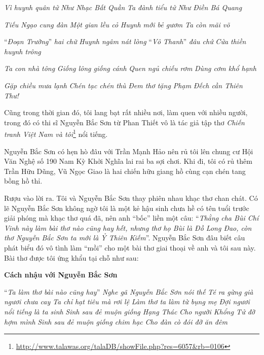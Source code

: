 \documentclass[../main.tex]{subfiles}
\begin{document}
\begin{multicols}{2}
\begin{blockquote}
\textit{Vì huynh quân tử}        
\textit{Như Nhạc Bất Quần}        
\textit{Ta đành tiểu tử} 
\textit{Như Ðiền Bá Quang} 
        
\textit{Tiếu Ngạo cung đàn}        
\textit{Một gian lều cỏ}        
\textit{Huynh mới bẻ gươm} 
\textit{Ta còn mãi võ} 
        
“\textit{Ðoạn Trường}” \textit{hai chữ}        
\textit{Huynh ngâm nát lòng}        
“\textit{Vô Thanh}” \textit{đâu chứ} 
\textit{Cửa thiền huynh trông} 
        
\textit{Ta con nhà tông}        
\textit{Giống lông giống cánh}        
\textit{Quen ngủ chiếu rơm} 
\textit{Dùng cơm khổ hạnh} 
        
\textit{Gặp chiều mưa lạnh}        
\textit{Chén tạc chén thù}        
\textit{Ðem thơ tặng Phạm} 
\textit{Ðếch cần Thiên Thư!} 

\end{blockquote}
 
Cũng trong thời gian đó, tôi lang bạt rất nhiều nơi, làm quen với nhiều người, trong đó có thi sĩ Nguyễn Bắc Sơn từ Phan Thiết vô là tác giả tập thơ \textit{Chiến tranh Việt Nam và tôi}\footnote{\url{http://www.talawas.org/talaDB/showFile.php?res=6057&rb=0106}} nổi tiếng.  
 
Nguyễn Bắc Sơn có hẹn hò đâu với Trần Mạnh Hảo nên rủ tôi lên chung cư Hội Văn Nghệ số 190 Nam Kỳ Khởi Nghĩa lai rai ba sợi chơi. Khi đi, tôi có rủ thêm Trần Hữu Dũng, Vũ Ngọc Giao là hai chiến hữu giang hồ cùng cạn chén tang bồng hồ thỉ. 
 
Rượu vào lời ra. Tôi và Nguyễn Bắc Sơn thay phiên nhau khạc thơ chan chát. Có lẽ Nguyễn Bắc Sơn không ngờ tôi là một kẻ hậu sinh chưa hề có tên tuổi trước giải phóng mà khạc thơ quá đã, nên anh “bốc” liền một câu: “\textit{Thằng cha Bùi Chí Vinh này làm bài thơ nào cũng hay hết, nhưng thơ họ Bùi là Ðồ Long Ðao, còn thơ Nguyễn Bắc Sơn ta mới là Ỷ Thiên Kiếm}”. Nguyễn Bắc Sơn đâu biết câu phát biểu đó vô tình làm “mồi” cho một bài thơ giai thoại về anh và tôi sau này. Bài thơ được tôi ứng khẩu tại chỗ như sau: 
\begin{blockquote}
 
\textbf{Cách nhậu với Nguyễn Bắc Sơn} 
        
“\textit{Ta làm thơ bài nào cũng hay}”        
\textit{Nghe gã Nguyễn Bắc Sơn nói thế}        
\textit{Té ra gừng già ngươi chưa cay}        
\textit{Ta chỉ hạt tiêu mà rơi lệ}        
\textit{Làm thơ ta làm từ bụng mẹ}        
\textit{Ðợi ngươi nổi tiếng là ta sinh}        
\textit{Sinh sau đẻ muộn giống Hạng Thác}        
\textit{Cho người Khổng Tử đỡ hợm mình}        
\textit{Sinh sau đẻ muộn giống chim hạc} 
\textit{Cho đàn cò đói đỡ ăn đêm} 
        

\end{blockquote}
\end{multicols}
\end{document}
